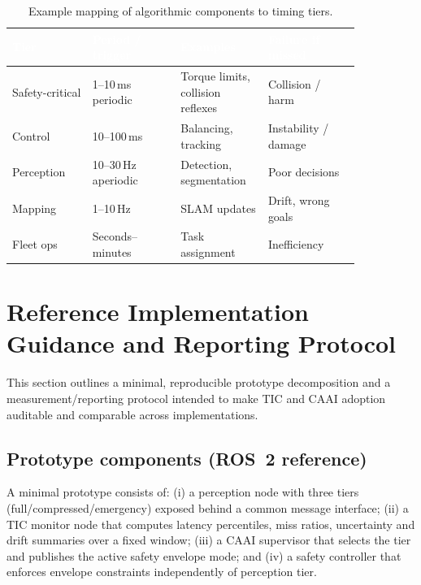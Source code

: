 \documentclass[smallextended]{svjour3}
\begin{document}
\begin{table}[htbp]
  \centering
  \caption{Example mapping of algorithmic components to timing tiers.}
  \label{tab:tiers}
  \setlength{\tabcolsep}{3pt}%
  \renewcommand{\arraystretch}{1.15}%
  \begin{tabular}{@{}C{0.20\linewidth}C{0.22\linewidth}C{0.20\linewidth}C{0.23\linewidth}@{}}
    \toprule
    \textcolor{white}{\textbf{Tier}} &
    \textcolor{white}{\textbf{Period / trigger}} &
    \textcolor{white}{\textbf{Examples}} &
    \textcolor{white}{\textbf{Failure if missed}} \\
    \midrule
    Safety-critical & 1--10\,ms periodic   & Torque limits, collision reflexes & Collision / harm \\
    Control         & 10--100\,ms          & Balancing, tracking               & Instability / damage \\
    Perception      & 10--30\,Hz aperiodic & Detection, segmentation           & Poor decisions \\
    Mapping         & 1--10\,Hz            & SLAM updates                      & Drift, wrong goals \\
    Fleet ops       & Seconds--minutes     & Task assignment                   & Inefficiency \\
    \bottomrule
  \end{tabular}
  \renewcommand{\arraystretch}{1}%
\end{table}

\section{Reference Implementation Guidance and Reporting Protocol}
\label{sec:eval}

This section outlines a minimal, reproducible prototype decomposition and a
measurement/reporting protocol intended to make TIC and CAAI adoption auditable
and comparable across implementations.

\subsection{Prototype components (ROS~2 reference)}

A minimal prototype consists of: (i) a perception node with three tiers
(full/compressed/emergency) exposed behind a common message interface; (ii) a
TIC monitor node that computes latency percentiles, miss ratios, uncertainty and
drift summaries over a fixed window; (iii) a CAAI supervisor that selects the tier
and publishes the active safety envelope mode; and (iv) a safety controller that
enforces envelope constraints independently of perception tier.
\end{document}
